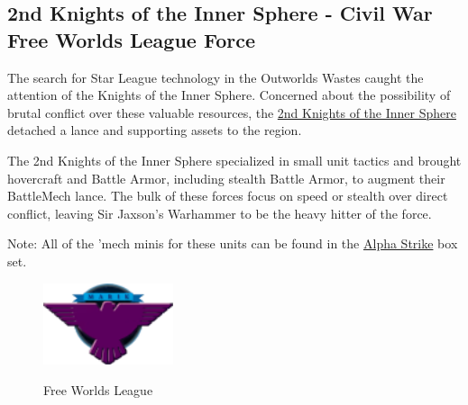 \subsection{2nd Knights of the Inner Sphere - Civil War Free Worlds League Force}

The search for Star League technology in the Outworlds Wastes caught the attention of the Knights of the Inner Sphere.
Concerned about the possibility of brutal conflict over these valuable resources, the \href{https://www.sarna.net/wiki/2nd_Knights_of_the_Inner_Sphere}{2nd Knights of the Inner Sphere} detached a lance and supporting assets to the region.

The 2nd Knights of the Inner Sphere specialized in small unit tactics and brought hovercraft and Battle Armor, including stealth Battle Armor, to augment their BattleMech lance.
The bulk of these forces focus on speed or stealth over direct conflict, leaving Sir Jaxson's Warhammer to be the heavy hitter of the force.
          	
Note: All of the 'mech minis for these units can be found in the \href{https://www.sarna.net/wiki/Alpha_Strike_Boxed_Set}{Alpha Strike} box set. 

\begin{figure}[!h]
  \centering
  \includegraphics[alt='Free Worlds League Logo', width=1.5in, height=0.944in]{img/Free-Worlds-League.png}
  \caption*{Free Worlds League}
\end{figure}

